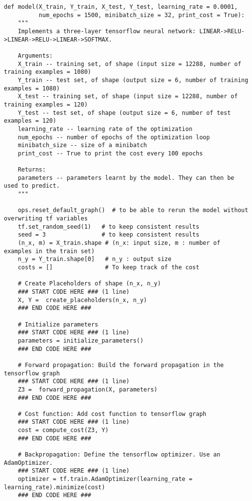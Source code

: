 \begin{verbatim}
def model(X_train, Y_train, X_test, Y_test, learning_rate = 0.0001,
          num_epochs = 1500, minibatch_size = 32, print_cost = True):
    """
    Implements a three-layer tensorflow neural network: LINEAR->RELU->LINEAR->RELU->LINEAR->SOFTMAX.
    
    Arguments:
    X_train -- training set, of shape (input size = 12288, number of training examples = 1080)
    Y_train -- test set, of shape (output size = 6, number of training examples = 1080)
    X_test -- training set, of shape (input size = 12288, number of training examples = 120)
    Y_test -- test set, of shape (output size = 6, number of test examples = 120)
    learning_rate -- learning rate of the optimization
    num_epochs -- number of epochs of the optimization loop
    minibatch_size -- size of a minibatch
    print_cost -- True to print the cost every 100 epochs
    
    Returns:
    parameters -- parameters learnt by the model. They can then be used to predict.
    """
    
    ops.reset_default_graph()  # to be able to rerun the model without overwriting tf variables
    tf.set_random_seed(1)   # to keep consistent results
    seed = 3                # to keep consistent results
    (n_x, m) = X_train.shape # (n_x: input size, m : number of examples in the train set)
    n_y = Y_train.shape[0]   # n_y : output size
    costs = []               # To keep track of the cost
    
    # Create Placeholders of shape (n_x, n_y)
    ### START CODE HERE ### (1 line)
    X, Y =  create_placeholders(n_x, n_y)
    ### END CODE HERE ###

    # Initialize parameters
    ### START CODE HERE ### (1 line)
    parameters = initialize_parameters()
    ### END CODE HERE ###
    
    # Forward propagation: Build the forward propagation in the tensorflow graph
    ### START CODE HERE ### (1 line)
    Z3 =  forward_propagation(X, parameters)
    ### END CODE HERE ###
    
    # Cost function: Add cost function to tensorflow graph
    ### START CODE HERE ### (1 line)
    cost = compute_cost(Z3, Y)
    ### END CODE HERE ###
    
    # Backpropagation: Define the tensorflow optimizer. Use an AdamOptimizer.
    ### START CODE HERE ### (1 line)
    optimizer = tf.train.AdamOptimizer(learning_rate = learning_rate).minimize(cost)
    ### END CODE HERE ###
    

\end{verbatim}
